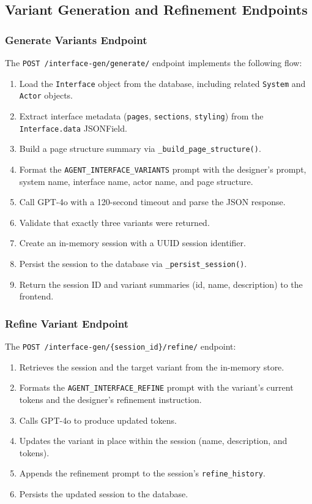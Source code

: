 \subsection{Variant Generation and Refinement Endpoints}

\subsubsection{Generate Variants Endpoint}

The \texttt{POST /interface-gen/generate/} endpoint implements the following flow:

\begin{enumerate}
    \item Load the \texttt{Interface} object from the database, including related \texttt{System} and \texttt{Actor} objects.
    \item Extract interface metadata (\texttt{pages}, \texttt{sections}, \texttt{styling}) from the \texttt{Interface.data} JSONField.
    \item Build a page structure summary via \texttt{\_build\_page\_structure()}.
    \item Format the \texttt{AGENT\_INTERFACE\_VARIANTS} prompt with the designer's prompt, system name, interface name, actor name, and page structure.
    \item Call GPT-4o with a 120-second timeout and parse the JSON response.
    \item Validate that exactly three variants were returned.
    \item Create an in-memory session with a UUID session identifier.
    \item Persist the session to the database via \texttt{\_persist\_session()}.
    \item Return the session ID and variant summaries (id, name, description) to the frontend.
\end{enumerate}


\subsubsection{Refine Variant Endpoint}

The \texttt{POST /interface-gen/\{session\_id\}/refine/} endpoint:

\begin{enumerate}
    \item Retrieves the session and the target variant from the in-memory store.
    \item Formats the \texttt{AGENT\_INTERFACE\_REFINE} prompt with the variant's current tokens and the designer's refinement instruction.
    \item Calls GPT-4o to produce updated tokens.
    \item Updates the variant in place within the session (name, description, and tokens).
    \item Appends the refinement prompt to the session's \texttt{refine\_history}.
    \item Persists the updated session to the database.
\end{enumerate}


